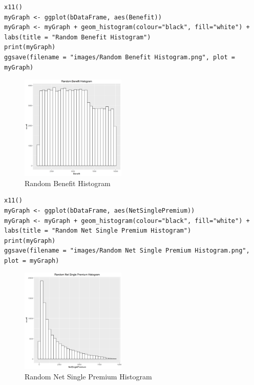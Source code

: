 \documentclass[12pt]{article}
\begin{document}
\begin{lstlisting}[caption={Random Benefit Histogram}]
x11()
myGraph <- ggplot(bDataFrame, aes(Benefit))
myGraph <- myGraph + geom_histogram(colour="black", fill="white") + labs(title = "Random Benefit Histogram")
print(myGraph)
ggsave(filename = "images/Random Benefit Histogram.png", plot = myGraph)
\end{lstlisting}

\begin{figure}[h]
	\centering
	\includegraphics[width=0.5\linewidth, height=5cm]{S3.png}
	\caption{Random Benefit Histogram }
	
\end{figure}
\pagebreak
\begin{lstlisting}[caption={ Random Net Single Premium Histogram},captionpos=b]
x11()
myGraph <- ggplot(bDataFrame, aes(NetSinglePremium))
myGraph <- myGraph + geom_histogram(colour="black", fill="white") + labs(title = "Random Net Single Premium Histogram")
print(myGraph)
ggsave(filename = "images/Random Net Single Premium Histogram.png", plot = myGraph)
\end{lstlisting}
\begin{figure}[h]
	\centering
	\includegraphics[width=0.5\linewidth, height=5cm]{S4.png}
	\caption{Random Net Single Premium Histogram }
	
\end{figure}
\end{document}
